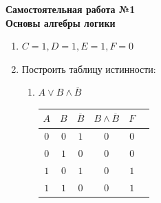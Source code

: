 



    \begin{center}
        \textbf{
            Самостоятельная работа №1\\
            Основы алгебры логики}
    \end{center}

    \begin{enumerate}
        \item $C = 1, D = 1, E = 1, F = 0$

        \item Построить таблицу истинности:
        \begin{enumerate}
            \item $A \vee B \wedge \overline B$\\
            \begin{tabular}{|c|c|c|c|c|c}
                \hline
                $A$ & $B$ & $\overline B$ & $B \wedge \overline B$ & $F$ \\
                \hline
                $0$ & $0$ & $1$           & $0$                    & $0$ \\
                \hline
                $0$ & $1$ & $0$           & $0$                    & $0$ \\
                \hline
                $1$ & $0$ & $1$           & $0$                    & $1$ \\
                \hline
                $1$ & $1$ & $0$           & $0$                    & $1$ \\
                \hline
            \end{tabular}


\end{enumerate}
\end{enumerate}
